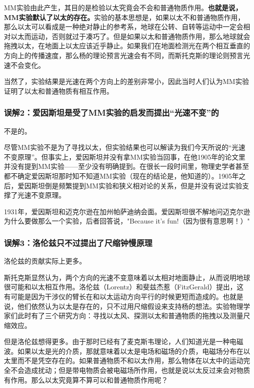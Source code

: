 MM实验由此产生，其目的是检验以太究竟会不会和普通物质作用。\textbf{也就是说，MM实验默认了以太的存在。}实验的基本思想是，如果以太不和普通物质作用，那么以太可以看成是一种绝对静止的参考系，地球在公转、自转等运动中一定会相对以太而运动，否则就过于凑巧了。但是如果以太和普通物质作用，那么地球就会拖拽以太，在地面上以太应该近乎静止。如果我们在地面检测光在两个相互垂直的方向上的传播速度，那么杨的理论预言光速会有不同，而斯托克斯的理论则预言光速不会变化。

当然了，实验结果是光速在两个方向上的差别非常小，因此当时人们认为MM实验证明了以太和普通物质有相互作用。

\subsubsection{误解2：爱因斯坦是受了MM实验的启发而提出“光速不变”的}

不是的。

尽管MM实验不是为了寻找以太，但实验结果也可以解读为我们今天所说的“光速不变原理”。但事实上，爱因斯坦并没有拿MM实验当回事，在他1905年的论文里并没有提到MM实验——至少没有明确提到。在很长一段时间里，物理史学者甚至都不确定爱因斯坦那时知不知道MM实验（现在的结论是，他知道的）。1905年之后，爱因斯坦倒是频繁提到MM实验和狭义相对论的关系，但是并没有说过实验支撑了光速不变原理。

1931年，爱因斯坦和迈克尔逊在加州帕萨迪纳会面。爱因斯坦很不解地问迈克尔逊为什么要做那么一个实验，后者回答说，"Because it's fun!（因为很有意思啊！）" 

\subsubsection{误解3：洛伦兹只不过提出了尺缩钟慢原理}

洛伦兹的贡献实际上更多。

斯托克斯显然认为，两个方向的光速不变意味着以太相对地面静止，从而说明地球很可能和以太相互作用。洛伦兹（Lorentz）和斐兹杰惹（FitzGerald）提出，这有可能是因为干涉仪的臂长在和以太运动方向平行的时候更短而造成的。也就是说，他们依然认为以太是存在的，只不过用尺缩假设来支持杨的想法。实验物理学家们此时有了三个研究方向：寻找以太风、探测以太和普通物质的拖拽以及测量尺缩效应。

但是洛伦兹想得更多。由于那时已经有了麦克斯韦理论，人们知道光是一种电磁波。如果以太是光的介质，那就意味着以太是电场和磁场的介质，电磁场分布在以太里而不是凭空存在的。如果普通物质不和以太作用，那么物体在以太中的运动完全不会造成扰动；但是带电物质会被电磁场所作用，也就是说以太反过来会对物质有作用。那么以太究竟算不算可以和普通物质作用呢？


